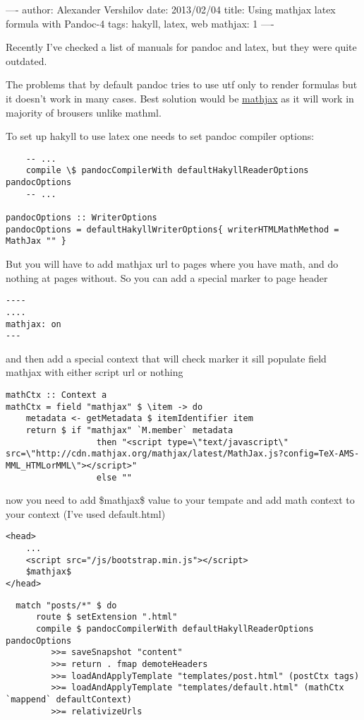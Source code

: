 ----
author: Alexander Vershilov
date: 2013/02/04
title: Using mathjax latex formula with Pandoc-4
tags: hakyll, latex, web
mathjax: 1
----

Recently I've checked a list of manuals for pandoc and latex, but they
were quite outdated.

The problems that by default pandoc tries to use utf only to render
formulas but it doesn't work in many cases. Best solution would be
\href{http://www.mathjax.org/}{mathjax} as it will work in majority of
brousers unlike mathml.

To set up hakyll to use latex one needs to set pandoc compiler options:

\begin{verbatim}
    -- ...
    compile \$ pandocCompilerWith defaultHakyllReaderOptions pandocOptions 
    -- ...

pandocOptions :: WriterOptions
pandocOptions = defaultHakyllWriterOptions{ writerHTMLMathMethod = MathJax "" }
\end{verbatim}

But you will have to add mathjax url to pages where you have math, and do
nothing at pages without. So you can add a special marker to page 
header

\begin{verbatim}
----
....
mathjax: on
---
\end{verbatim}

and then add a special context that will check marker it sill populate field
mathjax with either script url or nothing

\begin{verbatim}
mathCtx :: Context a
mathCtx = field "mathjax" $ \item -> do
    metadata <- getMetadata $ itemIdentifier item
    return $ if "mathjax" `M.member` metadata
                  then "<script type=\"text/javascript\" src=\"http://cdn.mathjax.org/mathjax/latest/MathJax.js?config=TeX-AMS-MML_HTMLorMML\"></script>"
                  else ""
\end{verbatim}

now you need to add \$mathjax\$ value to your tempate and add math context to
your context (I've used default.html)

\begin{verbatim}
<head>
    ...
    <script src="/js/bootstrap.min.js"></script>
    $mathjax$
</head>
\end{verbatim}

\begin{verbatim}
  match "posts/*" $ do
      route $ setExtension ".html"
      compile $ pandocCompilerWith defaultHakyllReaderOptions pandocOptions 
         >>= saveSnapshot "content"
         >>= return . fmap demoteHeaders
         >>= loadAndApplyTemplate "templates/post.html" (postCtx tags)
         >>= loadAndApplyTemplate "templates/default.html" (mathCtx `mappend` defaultContext)
         >>= relativizeUrls
\end{verbatim}

